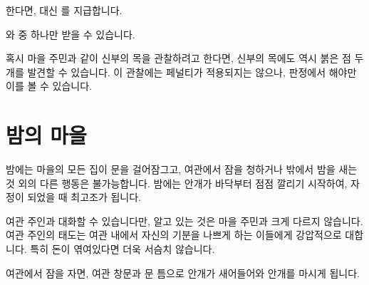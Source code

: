 \documentclass{report}
\begin{document}
	 한다면,  대신 를 지급합니다.
	
	\hypertarget{bloody:silver-cross}{}
	
	와  중 하나만 받을 수 있습니다.
	
	혹시 마을 주민과 같이 신부의 목을 관찰하려고 한다면, 신부의 목에도 역시 붉은 점 두개를 발견할 수 있습니다. 이 관찰에는 페널티가 적용되지는 않으나, 판정에서 해야만 이를 볼 수 있습니다.
	
	\section{밤의 마을}
	밤에는 마을의 모든 집이 문을 걸어잠그고, 여관에서 잠을 청하거나 밖에서 밤을 새는 것 외의 다른 행동은 불가능합니다. 밤에는 안개가 바닥부터 점점 깔리기 시작하여, 자정이 되었을 때 최고조가 됩니다.
	
	여관 주인과 대화할 수 있습니다만, 알고 있는 것은 마을 주민과 크게 다르지 않습니다. 여관 주인의 태도는 여관 내에서 자신의 기분을 나쁘게 하는 이들에게 강압적으로 대합니다. 특히 돈이 엮여있다면 더욱 서슴치 않습니다.
	
	
	여관에서 잠을 자면, 여관 창문과 문 틈으로 안개가 새어들어와 안개를 마시게 됩니다.
	
\end{document}
